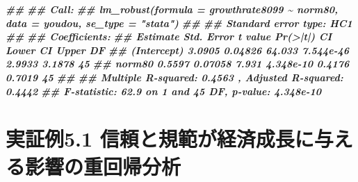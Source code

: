 \documentclass[
]{book}
\newenvironment{Shaded}{\begin{snugshade}}{\end{snugshade}}
\newcommand{\DocumentationTok}[1]{\textcolor[rgb]{0.56,0.35,0.01}{\textbf{\textit{#1}}}}
\begin{document}
\begin{Shaded}
\begin{Highlighting}[]
\DocumentationTok{\#\# }
\DocumentationTok{\#\# Call:}
\DocumentationTok{\#\# lm\_robust(formula = growthrate8099 \textasciitilde{} norm80, data = youdou, se\_type = "stata")}
\DocumentationTok{\#\# }
\DocumentationTok{\#\# Standard error type:  HC1 }
\DocumentationTok{\#\# }
\DocumentationTok{\#\# Coefficients:}
\DocumentationTok{\#\#             Estimate Std. Error t value  Pr(\textgreater{}|t|) CI Lower CI Upper DF}
\DocumentationTok{\#\# (Intercept)   3.0905    0.04826  64.033 7.544e{-}46   2.9933   3.1878 45}
\DocumentationTok{\#\# norm80        0.5597    0.07058   7.931 4.348e{-}10   0.4176   0.7019 45}
\DocumentationTok{\#\# }
\DocumentationTok{\#\# Multiple R{-}squared:  0.4563 ,    Adjusted R{-}squared:  0.4442 }
\DocumentationTok{\#\# F{-}statistic:  62.9 on 1 and 45 DF,  p{-}value: 4.348e{-}10}
\end{Highlighting}
\end{Shaded}

\hypertarget{ex5.1}{%
\section*{実証例5.1 信頼と規範が経済成長に与える影響の重回帰分析}\label{ex5.1}}
\end{document}
